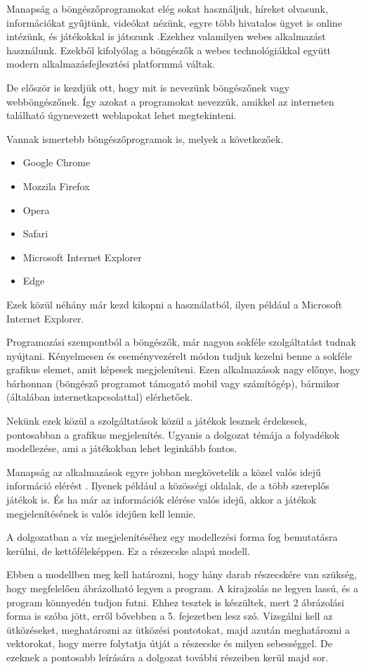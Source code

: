 

Manapság a böngészőprogramokat elég sokat használjuk, híreket olvasunk, információkat gyűjtünk, videókat nézünk, egyre több hivatalos ügyet is online intézünk, és játékokkal is játszunk \cite{alk}.Ezekhez valamilyen webes alkalmazást használunk. Ezekből kifolyólag a böngészők a webes technológiákkal együtt modern alkalmazásfejlesztési platformmá váltak.


De először is kezdjük ott, hogy mit is nevezünk böngészőnek vagy webböngészőnek. Így azokat a programokat nevezzük, amikkel az interneten található úgynevezett weblapokat lehet megtekinteni. 

Vannak ismertebb böngészőprogramok is, melyek a következőek.

\begin{itemize}
	\item Google Chrome
	\item Mozzila Firefox
	\item Opera
	\item Safari
	\item Microsoft Internet Explorer
	\item Edge
\end{itemize}

Ezek közül néhány már kezd kikopni a használatból, ilyen például a Microsoft Internet Explorer. 
 

Programozási szempontból a böngészők, már nagyon sokféle szolgáltatást tudnak nyújtani. Kényelmesen és eseményvezérelt módon tudjuk kezelni benne a sokféle grafikus elemet, amit képesek megjeleníteni. Ezen alkalmazások nagy előnye, hogy bárhonnan (böngésző programot támogató mobil vagy számítógép), bármikor (általában internetkapcsolattal) elérhetőek. 

Nekünk ezek közül a szolgáltatások közül a játékok lesznek érdekesek, pontosabban a grafikus megjelenítés. Ugyanis a dolgozat témája a folyadékok modellezése, ami a játékokban lehet leginkább fontos.  



Manapság az alkalmazások egyre jobban megkövetelik a közel valós idejű információ elérést \cite{valos}. Ilyenek például a közösségi oldalak, de a több szereplős játékok is. És ha már az információk elérése valós idejű, akkor a játékok megjelenítésének is valós idejűen kell lennie.

A dolgozatban a víz megjelenítéséhez egy modellezési forma fog bemutatásra kerülni, de kettőféleképpen. Ez a részecske alapú modell.


Ebben a modellben meg kell határozni, hogy hány darab részecskére van szükség, hogy megfelelően ábrázolható legyen a program. A kirajzolás ne legyen lassú, és a program könnyedén tudjon futni. Ehhez tesztek is készültek, mert 2 ábrázolási forma is szóba jött, erről bővebben a 5. fejezetben lesz szó. Vizsgálni kell az ütközéseket, meghatározni az ütközési pontotokat, majd azután meghatározni a vektorokat, hogy merre folytatja útját a részecske és milyen sebességgel. De ezeknek a pontosabb leírására a dolgozat további részeiben kerül majd sor. 



